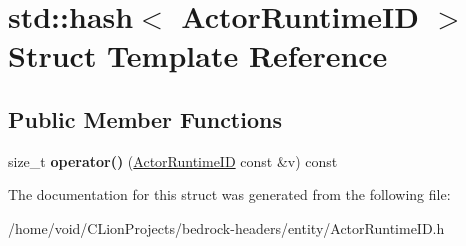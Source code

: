 \hypertarget{structstd_1_1hash_3_01_actor_runtime_i_d_01_4}{}\section{std\+::hash$<$ Actor\+Runtime\+ID $>$ Struct Template Reference}
\label{structstd_1_1hash_3_01_actor_runtime_i_d_01_4}
\subsection*{Public Member Functions}
\begin{DoxyCompactItemize}
\item 
\mbox{\label{structstd_1_1hash_3_01_actor_runtime_i_d_01_4_a716af1694f8e40b04758228765e45844}} 
size\+\_\+t {\bfseries operator()} (\mbox{\hyperlink{struct_actor_runtime_i_d}{Actor\+Runtime\+ID}} const \&v) const
\end{DoxyCompactItemize}


The documentation for this struct was generated from the following file\+:\begin{DoxyCompactItemize}
\item 
/home/void/\+C\+Lion\+Projects/bedrock-\/headers/entity/Actor\+Runtime\+I\+D.\+h\end{DoxyCompactItemize}
